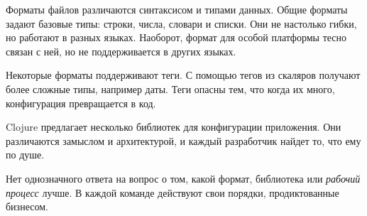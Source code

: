 Форматы файлов различаются синтаксисом и типами данных. Общие форматы задают
базовые типы: строки, числа, словари и списки. Они не настолько гибки, но
работают в разных языках. Наоборот, формат для особой платформы тесно связан с
ней, но не поддерживается в других языках.

Некоторые форматы поддерживают теги. С помощью тегов из скаляров получают более
сложные типы, например даты. Теги опасны тем, что когда их много, конфигурация
превращается в код.

Clojure предлагает несколько библиотек для конфигурации приложения. Они
различаются замыслом и архитектурой, и каждый разработчик найдет то, что ему по
душе.

Нет однозначного ответа на вопрос о том, какой формат, библиотека или
\emph{рабочий процесс} лучше. В каждой команде действуют свои порядки,
продиктованные бизнесом.
